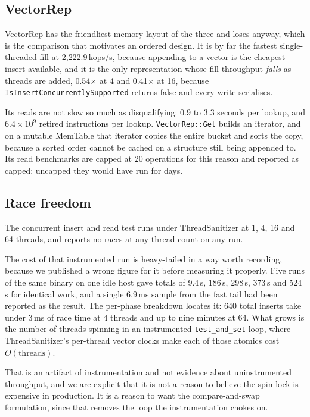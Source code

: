 \documentclass[conference]{IEEEtran}
\begin{document}
\subsection{VectorRep}
\label{sec:vectorrep}

VectorRep has the friendliest memory layout of the three and loses anyway, which
is the comparison that motivates an ordered design. It is by far the fastest
single-threaded fill at 2{,}222.9\,kops/s, because appending to a vector is the
cheapest insert available, and it is the only representation whose fill throughput
\emph{falls} as threads are added, 0.54$\times$ at 4 and 0.41$\times$ at 16,
because \texttt{IsInsertConcurrentlySupported} returns false and every write
serialises.

Its reads are not slow so much as disqualifying: 0.9 to 3.3 seconds per lookup,
and $6.4 \times 10^9$ retired instructions per lookup.
\texttt{VectorRep::Get} builds an iterator, and on a mutable MemTable that
iterator copies the entire bucket and sorts the copy, because a sorted order
cannot be cached on a structure still being appended to. Its read benchmarks are
capped at 20 operations for this reason and reported as capped; uncapped they
would have run for days.

\subsection{Race freedom}
\label{sec:tsan}

The concurrent insert and read test runs under ThreadSanitizer
\cite{serebryany2009tsan} at 1, 4, 16 and 64 threads, and reports no races at any
thread count on any run.

The cost of that instrumented run is heavy-tailed in a way worth recording,
because we published a wrong figure for it before measuring it properly. Five runs
of the same binary on one idle host gave totals of 9.4\,s, 186\,s, 298\,s, 373\,s
and 524\,s for identical work, and a single 6.9\,ms sample from the fast tail had
been reported as the result. The per-phase breakdown locates it: 640 total inserts
take under 3\,ms of race time at 4 threads and up to nine minutes at 64. What
grows is the number of threads spinning in an instrumented \texttt{test\_and\_set}
loop, where ThreadSanitizer's per-thread vector clocks make each of those atomics
cost $O(\text{threads})$.

That is an artifact of instrumentation and not evidence about uninstrumented
throughput, and we are explicit that it is not a reason to believe the spin lock
is expensive in production. It is a reason to want the compare-and-swap
formulation, since that removes the loop the instrumentation chokes on.
\end{document}
